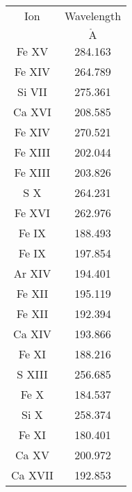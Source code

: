 \begin{table}
\begin{tabular}{cc}
Ion & Wavelength \\
 & $\mathrm{\mathring{A}}$ \\
Fe XV & 284.163 \\
Fe XIV & 264.789 \\
Si VII & 275.361 \\
Ca XVI & 208.585 \\
Fe XIV & 270.521 \\
Fe XIII & 202.044 \\
Fe XIII & 203.826 \\
S X & 264.231 \\
Fe XVI & 262.976 \\
Fe IX & 188.493 \\
Fe IX & 197.854 \\
Ar XIV & 194.401 \\
Fe XII & 195.119 \\
Fe XII & 192.394 \\
Ca XIV & 193.866 \\
Fe XI & 188.216 \\
S XIII & 256.685 \\
Fe X & 184.537 \\
Si X & 258.374 \\
Fe XI & 180.401 \\
Ca XV & 200.972 \\
Ca XVII & 192.853 \\
\end{tabular}
\end{table}
